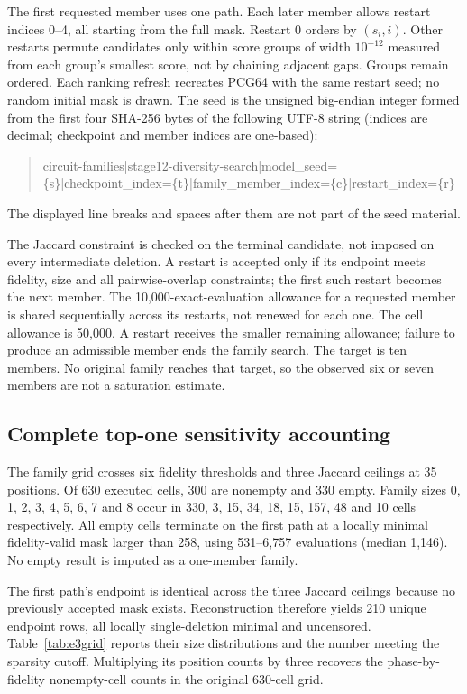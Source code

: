 \documentclass[10pt]{article}
\begin{document}
The first requested member uses one path. Each later member allows restart indices 0--4, all starting from the full mask. Restart 0 orders by $(s_i,i)$. Other restarts permute candidates only within score groups of width $10^{-12}$ measured from each group's smallest score, not by chaining adjacent gaps. Groups remain ordered. Each ranking refresh recreates PCG64 with the same restart seed; no random initial mask is drawn. The seed is the unsigned big-endian integer formed from the first four SHA-256 bytes of the following UTF-8 string (indices are decimal; checkpoint and member indices are one-based):
\begin{quote}\small\ttfamily\raggedright
circuit-families|stage12-diversity-search|model\_seed=\{s\}|\allowbreak checkpoint\_index=\{t\}|\allowbreak family\_member\_index=\{c\}|\allowbreak restart\_index=\{r\}
\end{quote}
The displayed line breaks and spaces after them are not part of the seed material.

The Jaccard constraint is checked on the terminal candidate, not imposed on every intermediate deletion. A restart is accepted only if its endpoint meets fidelity, size and all pairwise-overlap constraints; the first such restart becomes the next member. The 10,000-exact-evaluation allowance for a requested member is shared sequentially across its restarts, not renewed for each one. The cell allowance is 50,000. A restart receives the smaller remaining allowance; failure to produce an admissible member ends the family search. The target is ten members. No original family reaches that target, so the observed six or seven members are not a saturation estimate.

\subsection{Complete top-one sensitivity accounting}
The family grid crosses six fidelity thresholds and three Jaccard ceilings at 35 positions. Of 630 executed cells, 300 are nonempty and 330 empty. Family sizes 0, 1, 2, 3, 4, 5, 6, 7 and 8 occur in 330, 3, 15, 34, 18, 15, 157, 48 and 10 cells respectively. All empty cells terminate on the first path at a locally minimal fidelity-valid mask larger than 258, using 531--6,757 evaluations (median 1,146). No empty result is imputed as a one-member family.

The first path's endpoint is identical across the three Jaccard ceilings because no previously accepted mask exists. Reconstruction therefore yields 210 unique endpoint rows, all locally single-deletion minimal and uncensored. Table~\ref{tab:e3grid} reports their size distributions and the number meeting the sparsity cutoff. Multiplying its position counts by three recovers the phase-by-fidelity nonempty-cell counts in the original 630-cell grid.

\end{document}
